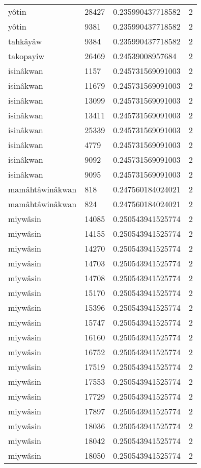 \begin{longtable}{llll}
yôtin & 28427 & 0.235990437718582 & 2 \\
yôtin & 9381 & 0.235990437718582 & 2 \\
tahkâyâw & 9384 & 0.235990437718582 & 2 \\
takopayiw & 26469 & 0.24539008957684 & 2 \\
isinâkwan & 1157 & 0.245731569091003 & 2 \\
isinâkwan & 11679 & 0.245731569091003 & 2 \\
isinâkwan & 13099 & 0.245731569091003 & 2 \\
isinâkwan & 13411 & 0.245731569091003 & 2 \\
isinâkwan & 25339 & 0.245731569091003 & 2 \\
isinâkwan & 4779 & 0.245731569091003 & 2 \\
isinâkwan & 9092 & 0.245731569091003 & 2 \\
isinâkwan & 9095 & 0.245731569091003 & 2 \\
mamâhtâwinâkwan & 818 & 0.247560184024021 & 2 \\
mamâhtâwinâkwan & 824 & 0.247560184024021 & 2 \\
miywâsin & 14085 & 0.250543941525774 & 2 \\
miywâsin & 14155 & 0.250543941525774 & 2 \\
miywâsin & 14270 & 0.250543941525774 & 2 \\
miywâsin & 14703 & 0.250543941525774 & 2 \\
miywâsin & 14708 & 0.250543941525774 & 2 \\
miywâsin & 15170 & 0.250543941525774 & 2 \\
miywâsin & 15396 & 0.250543941525774 & 2 \\
miywâsin & 15747 & 0.250543941525774 & 2 \\
miywâsin & 16160 & 0.250543941525774 & 2 \\
miywâsin & 16752 & 0.250543941525774 & 2 \\
miywâsin & 17519 & 0.250543941525774 & 2 \\
miywâsin & 17553 & 0.250543941525774 & 2 \\
miywâsin & 17729 & 0.250543941525774 & 2 \\
miywâsin & 17897 & 0.250543941525774 & 2 \\
miywâsin & 18036 & 0.250543941525774 & 2 \\
miywâsin & 18042 & 0.250543941525774 & 2 \\
miywâsin & 18050 & 0.250543941525774 & 2 \\

\end{longtable}
